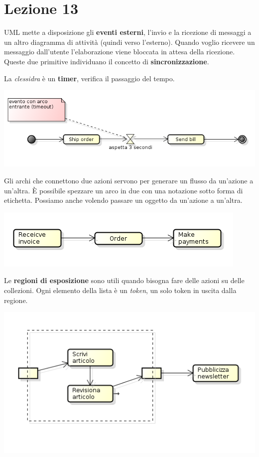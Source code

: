 \section{Lezione 13}

UML mette a disposizione gli \textbf{eventi esterni}, l'invio e la ricezione di messaggi a un altro diagramma di attività (quindi verso l'esterno). Quando voglio ricevere un messaggio dall'utente l'elaborazione viene bloccata in attesa della ricezione. Queste due primitive individuano il concetto di \textbf{sincronizzazione}.

La \textit{clessidra} è un \textbf{timer}, verifica il passaggio del tempo.

\begin{center}
\includegraphics[width=0.75\columnwidth]{img1} %
\end{center}

Gli archi che connettono due azioni servono per generare un flusso da un'azione a un'altra. È possibile spezzare un arco in due con una notazione sotto forma di etichetta. Possiamo anche volendo passare un oggetto da un'azione a un'altra.

\begin{center}
\includegraphics[width=0.75\columnwidth]{img2} %
\end{center}

Le \textbf{regioni di esposizione} sono utili quando bisogna fare delle azioni su delle collezioni. Ogni elemento della lista è un \textit{token}, un solo token in uscita dalla regione.

\begin{center}
\includegraphics[width=0.75\columnwidth]{img3} %
\end{center}

